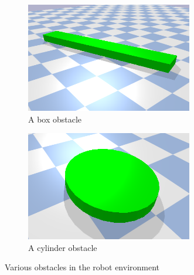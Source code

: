 \begin{figure}[H]
    \centering
    \begin{subfigure}{.5\textwidth}
    \centering
    \includegraphics[width=0.8\textwidth]{figures/box_obstacle.png}
    \caption{A box obstacle}
    \end{subfigure}%
    \begin{subfigure}{.5\textwidth}
    \centering
    \includegraphics[width=0.8\textwidth]{figures/cylinder_obstacle.png}
    \caption{A cylinder obstacle}
    \end{subfigure}%
    \caption{Various obstacles in the robot environment}
    \label{fig:example_obstacles}
\end{figure}



